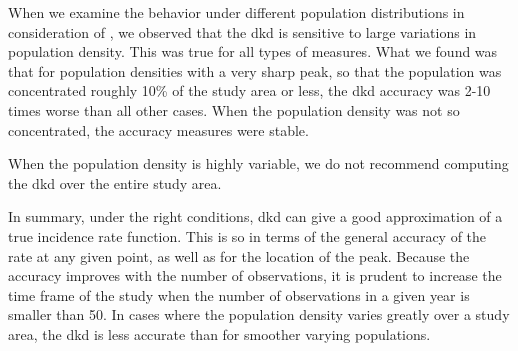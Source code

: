 When we examine the behavior under different population distributions in consideration of ,
we observed that the \gls{dkd} is sensitive to large variations in population density.
This was true for all types of measures.
What we found was that for population densities with a very sharp peak,
so that the population was concentrated roughly 10\% of the study area or less,
the \gls{dkd} accuracy was 2-10 times worse than all other cases.
When the population density was not so concentrated,
the accuracy measures were stable.
\begin{rec}
    \label{rec:pop-density}
    When the population density is highly variable,
    we do not recommend computing the \gls{dkd} over the entire study area.
\end{rec}

In summary,
under the right conditions,
\gls{dkd} can give a good approximation of a true \gls{incidence rate} function.
This is so in terms of the general accuracy of the rate at any given point,
as well as for the location of the peak.
Because the accuracy improves with the number of observations,
it is prudent to increase the time frame of the study when the number of observations in a given year is smaller than 50.
In cases where the population density varies greatly over a study area,
the \gls{dkd} is less accurate than for smoother varying populations.

